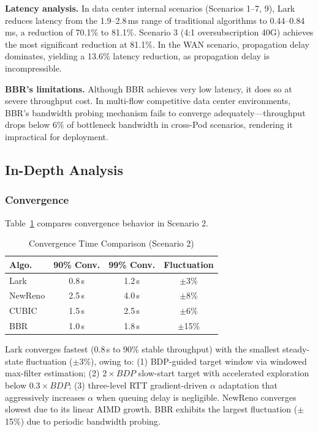 \documentclass[10pt,twocolumn]{article}
\begin{document}
\textbf{Latency analysis.} In data center internal scenarios (Scenarios 1--7, 9), Lark reduces latency from the 1.9--2.8\,ms range of traditional algorithms to 0.44--0.84\,ms, a reduction of 70.1\% to 81.1\%. Scenario 3 (4:1 oversubscription 40G) achieves the most significant reduction at 81.1\%. In the WAN scenario, propagation delay dominates, yielding a 13.6\% latency reduction, as propagation delay is incompressible.

\textbf{BBR's limitations.} Although BBR achieves very low latency, it does so at severe throughput cost. In multi-flow competitive data center environments, BBR's bandwidth probing mechanism fails to converge adequately---throughput drops below 6\% of bottleneck bandwidth in cross-Pod scenarios, rendering it impractical for deployment.

\subsection{In-Depth Analysis}

\subsubsection{Convergence}

Table~\ref{tab:convergence} compares convergence behavior in Scenario 2.

\begin{table}[htbp]
\centering
\caption{Convergence Time Comparison (Scenario 2)}
\label{tab:convergence}
\small
\begin{tabular}{lccc}
\toprule
\textbf{Algo.} & \textbf{90\% Conv.} & \textbf{99\% Conv.} & \textbf{Fluctuation} \\
\midrule
Lark & 0.8\,s & 1.2\,s & $\pm$3\% \\
NewReno & 2.5\,s & 4.0\,s & $\pm$8\% \\
CUBIC & 1.5\,s & 2.5\,s & $\pm$6\% \\
BBR & 1.0\,s & 1.8\,s & $\pm$15\% \\
\bottomrule
\end{tabular}
\end{table}

Lark converges fastest (0.8\,s to 90\% stable throughput) with the smallest steady-state fluctuation ($\pm$3\%), owing to: (1) BDP-guided target window via windowed max-filter estimation; (2) $2 \times BDP$ slow-start target with accelerated exploration below $0.3 \times BDP$; (3) three-level RTT gradient-driven $\alpha$ adaptation that aggressively increases $\alpha$ when queuing delay is negligible. NewReno converges slowest due to its linear AIMD growth. BBR exhibits the largest fluctuation ($\pm$15\%) due to periodic bandwidth probing.
\end{document}
